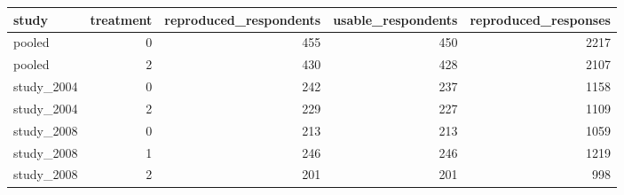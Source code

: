 \begin{tabular}{lrrrr}
\toprule
study & treatment & reproduced\_respondents & usable\_respondents & reproduced\_responses \\
\midrule
pooled & 0 & 455 & 450 & 2217 \\
pooled & 2 & 430 & 428 & 2107 \\
study\_2004 & 0 & 242 & 237 & 1158 \\
study\_2004 & 2 & 229 & 227 & 1109 \\
study\_2008 & 0 & 213 & 213 & 1059 \\
study\_2008 & 1 & 246 & 246 & 1219 \\
study\_2008 & 2 & 201 & 201 &  998 \\
\bottomrule
\end{tabular}
